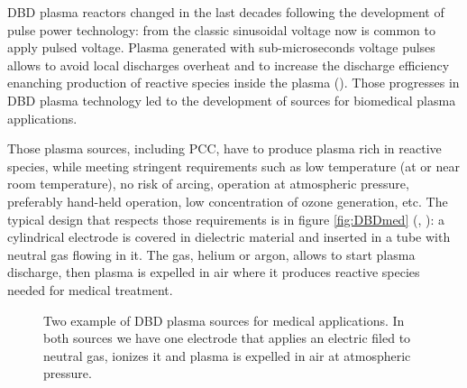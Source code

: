 DBD plasma reactors changed in the last decades following the development of pulse power technology: from the classic sinusoidal voltage now is common to apply pulsed voltage. Plasma generated with sub-microseconds voltage pulses allows to avoid local discharges overheat and to increase the discharge efficiency enanching production of reactive species inside the plasma (\cite{SHAO2009215}). Those progresses in DBD plasma technology led to the development of sources for biomedical plasma applications.

Those plasma sources, including PCC, have to produce plasma rich in reactive species, while meeting stringent requirements such as low temperature (at or near room temperature), no risk of arcing, operation at atmospheric pressure, preferably hand-held operation, low concentration of ozone generation, etc.
The typical design that respects those requirements is in figure \ref{fig:DBDmed} (\cite{Stoffels_2006}, \cite{doi:10.1063/1.2045549}): a cylindrical electrode is covered in dielectric material and inserted in a tube with neutral gas flowing in it. The gas, helium or argon, allows to start plasma discharge, then plasma is expelled in air where it produces reactive species needed for medical treatment.
\begin{figure}
 \centering
 \hfill
 \caption{Two example of DBD plasma sources for medical applications. In both sources we have one electrode that applies an electric filed to neutral gas, ionizes it and plasma is expelled in air at atmospheric pressure.}
\end{figure}

